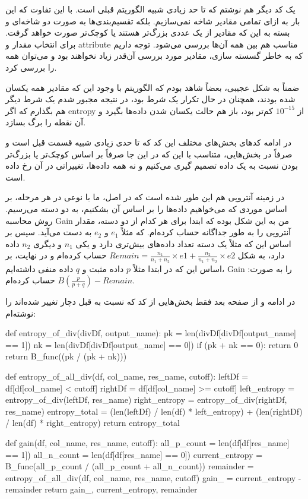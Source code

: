 \documentclass[12pt,titlepage,a4page , tikz , multi,table , svgnames,xcdraw]{article}
\begin{document}
\newpage

یک کد دیگر هم نوشتم که تا حد زیادی شبیه الگوریتم قبلی است. با این تفاوت که این بار به ازای تمامی مقادیر شاخه نمی‌سازیم. بلکه تقسیم‌بندی‌ها به صورت دو شاخه‌ای و بسته به این که مقادیر از یک عددی بزرگ‌تر هستند یا کوچک‌تر صورت خواهد گرفت. برای انتخاب مقدار و attribute مناسب هم بین همه آن‌ها بررسی می‌شود. توجه داریم که به خاطر گسسته سازی، مقادیر مورد بررسی آن‌قدر زیاد نخواهند بود و می‌توان همه را بررسی کرد.

ضمناً به شکل عجیبی، بعضاً شاهد بودم که الگوریتم با وجود این که مقادیر همه یکسان شده بودند، همچنان در حال تکرار یک شرط بود، در نتیجه مجبور شدم یک شرط دیگر هم بگذارم که اگر entropy از $10^{-15}$ کم‌تر بود، باز هم حالت یکسان شدن داده‌ها بگیرد و آن نقطه را برگ بسازد.

در ادامه کدهای بخش‌های مختلف این کد که تا حدی زیادی شبیه قسمت قبل است و صرفاً در بخش‌هایی، متناسب با این که در این جا صرفاً بر اساس کوچک‌تر یا بزرگ‌تر بودن نسبت به یک داده تصمیم گیری می‌کنیم و نه همه داده‌ها، تغییراتی در آن رخ داده است.

در زمینه آنتروپی هم این طور شده است که در اصل، ما با نوعی در هر مرحله، بر اساس موردی که می‌خواهیم داده‌ها را بر اساس آن بشکنیم، به دو دسته می‌رسیم. روش محاسبه Gain من به این شکل بوده که ابتدا برای هر کدام از دو دسته، مقدار آنتروپی را به طور جداگانه حساب کرده‌ام. که مثلاً $e_1$ و $e_2$ به دست می‌آید. سپس بر اساس این که مثلاً یک دسته تعداد داده‌های بیش‌تری دارد و یکی $n_1$ و دیگری $n_2$ داده دارد، به شکل
$Remain =\frac{n_1}{n_1 + n_2} \times e1 + \frac{n_2}{n_1 + n_2} \times e2$
حساب کرده‌ام و در نهایت، بر اساس این که در ابتدا مثلاً $p$ داده مثبت و $q$ داده منفی داشته‌ایم، Gain را به صورت:
$B(\frac{p}{p+q}) - Remain$
حساب کرده‌ام.

در ادامه و از صفحه بعد فقط بخش‌هایی از کد که نسبت به قبل دچار تغییر شده‌اند را نوشته‌ام:

\newpage

  \begin{latin}
\begin{python}[language=Python]


def entropy_of_div(divDf, output_name):
    pk = len(divDf[divDf[output_name] == 1])
    nk = len(divDf[divDf[output_name] == 0])
    if (pk + nk == 0):
        return 0
    return B_func((pk / (pk + nk)))


def entropy_of_all_div(df, col_name, res_name, cutoff):
    leftDf = df[df[col_name] < cutoff]
    rightDf = df[df[col_name] >= cutoff]
    left_entropy = entropy_of_div(leftDf, res_name)
    right_entropy = entropy_of_div(rightDf, res_name)
    entropy_total = (len(leftDf) / len(df) * left_entropy)
     + (len(rightDf) / len(df) * right_entropy)
    return entropy_total


def gain(df, col_name, res_name, cutoff):
    all_p_count = len(df[df[res_name] == 1])
    all_n_count = len(df[df[res_name] == 0])
    current_entropy = B_func(all_p_count / (all_p_count + all_n_count))
    remainder = entropy_of_all_div(df, col_name, res_name, cutoff)
    gain_ = current_entropy - remainder
    return gain_, current_entropy, remainder

\end{python}

\end{latin}
\end{document}
